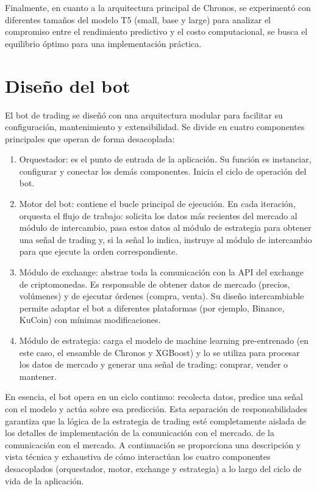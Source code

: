Finalmente, en cuanto a la arquitectura principal de Chronos, se experimentó con diferentes tamaños del modelo T5 (small, base y large) para analizar el compromiso entre el rendimiento predictivo y el costo computacional, se busca el equilibrio óptimo para una implementación práctica.

\section{Diseño del bot}
\label{subsec:bot-design}
El bot de trading se diseñó con una arquitectura modular para facilitar su configuración, mantenimiento y extensibilidad. Se divide en cuatro componentes principales que operan de forma desacoplada:

\begin{enumerate}
    \item Orquestador: es el punto de entrada de la aplicación. Su función es instanciar, configurar y conectar los demás componentes. Inicia el ciclo de operación del bot.
    \item Motor del bot: contiene el bucle principal de ejecución. En cada iteración, orquesta el flujo de trabajo: solicita los datos más recientes del mercado al módulo de intercambio, pasa estos datos al módulo de estrategia para obtener una señal de trading y, si la señal lo indica, instruye al módulo de intercambio para que ejecute la orden correspondiente.
    \item Módulo de exchange: abstrae toda la comunicación con la API del exchange de criptomonedas. Es responsable de obtener datos de mercado (precios, volúmenes) y de ejecutar órdenes (compra, venta). Su diseño intercambiable permite adaptar el bot a diferentes plataformas (por ejemplo, Binance, KuCoin) con mínimas modificaciones.
    \item Módulo de estrategia: carga el modelo de machine learning pre-entrenado (en este caso, el ensamble de Chronos y XGBoost) y lo se utiliza para procesar los datos de mercado y generar una señal de trading: comprar, vender o mantener.
\end{enumerate}

En esencia, el bot opera en un ciclo continuo: recolecta datos, predice una señal con el modelo y actúa sobre esa predicción. Esta separación de responsabilidades garantiza que la lógica de la estrategia de trading esté completamente aislada de los detalles de implementación de la comunicación con el mercado.
de la comunicación con el mercado.
A continuación se proporciona una descripción y vista técnica y exhaustiva de cómo interactúan los cuatro componentes desacoplados (orquestador, motor, exchange y estrategia) a lo largo del ciclo de vida de la aplicación.

